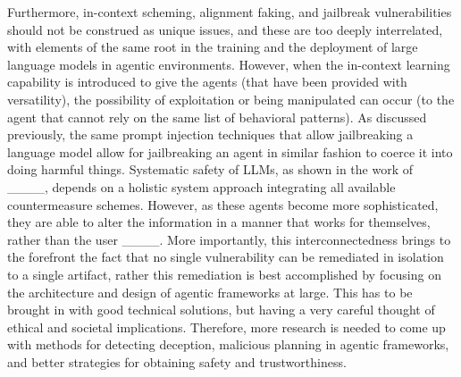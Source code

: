 Furthermore, in-context scheming, alignment faking, and jailbreak vulnerabilities should not be construed as unique issues, and these are too deeply interrelated, with elements of the same root in the training and the deployment of large language models in agentic environments. However, when the in-context learning capability is introduced to give the agents (that have been provided with versatility), the possibility of exploitation or being manipulated can occur (to the agent that cannot rely on the same list of behavioral patterns). As discussed previously, the same prompt injection techniques that allow jailbreaking a language model allow for jailbreaking an agent in similar fashion to coerce it into doing harmful things. Systematic safety of LLMs, as shown in the work of ____, depends on a holistic system approach integrating all available countermeasure schemes. However, as these agents become more sophisticated, they are able to alter the information in a manner that works for themselves, rather than the user ____. More importantly, this interconnectedness brings to the forefront the fact that no single vulnerability can be remediated in isolation to a single artifact, rather this remediation is best accomplished by focusing on the architecture and design of agentic frameworks at large. This has to be brought in with good technical solutions, but having a very careful thought of ethical and societal implications. Therefore, more research is needed to come up with methods for detecting deception, malicious planning in agentic frameworks, and better strategies for obtaining safety and trustworthiness.
